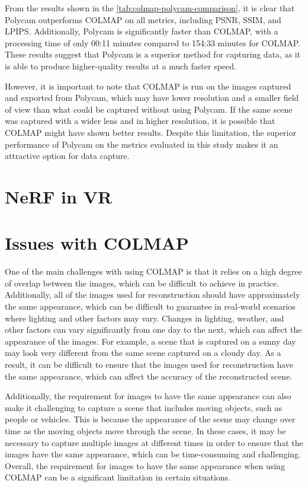 From the results shown in the \autoref{tab:colmap-polycam-comparison}, it is clear that Polycam outperforms COLMAP on all metrics, including PSNR, SSIM, and LPIPS. Additionally, Polycam is significantly faster than COLMAP, with a processing time of only 00:11 minutes compared to 154:33 minutes for COLMAP. These results suggest that Polycam is a superior method for capturing data, as it is able to produce higher-quality results at a much faster speed.

However, it is important to note that COLMAP is run on the images captured and exported from Polycam, which may have lower resolution and a smaller field of view than what could be captured without using Polycam. If the same scene was captured with a wider lens and in higher resolution, it is possible that COLMAP might have shown better results. Despite this limitation, the superior performance of Polycam on the metrics evaluated in this study makes it an attractive option for data capture.

\section{NeRF in VR}


\section{Issues with COLMAP}
One of the main challenges with using COLMAP is that it relies on a high degree of overlap between the images, which can be difficult to achieve in practice. Additionally, all of the images used for reconstruction should have approximately the same appearance, which can be difficult to guarantee in real-world scenarios where lighting and other factors may vary. Changes in lighting, weather, and other factors can vary significantly from one day to the next, which can affect the appearance of the images. For example, a scene that is captured on a sunny day may look very different from the same scene captured on a cloudy day. As a result, it can be difficult to ensure that the images used for reconstruction have the same appearance, which can affect the accuracy of the reconstructed scene.

Additionally, the requirement for images to have the same appearance can also make it challenging to capture a scene that includes moving objects, such as people or vehicles. This is because the appearance of the scene may change over time as the moving objects move through the scene. In these cases, it may be necessary to capture multiple images at different times in order to ensure that the images have the same appearance, which can be time-consuming and challenging. Overall, the requirement for images to have the same appearance when using COLMAP can be a significant limitation in certain situations.